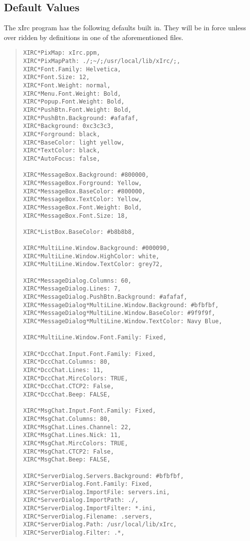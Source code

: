 \documentclass[titlepage]{article}
\begin{document}
\subsection{Default Values}
The xIrc program has the following defaults built in. They will be in
force unless over ridden by definitions in one of the aforementioned
files.
\begin{quote}
\begin{verbatim}
XIRC*PixMap: xIrc.ppm,
XIRC*PixMapPath: ./;~/;/usr/local/lib/xIrc/;,
XIRC*Font.Family: Helvetica,
XIRC*Font.Size: 12,
XIRC*Font.Weight: normal,
XIRC*Menu.Font.Weight: Bold,
XIRC*Popup.Font.Weight: Bold,
XIRC*PushBtn.Font.Weight: Bold,
XIRC*PushBtn.Background: #afafaf,
XIRC*Background: 0xc3c3c3,
XIRC*Forground: black,
XIRC*BaseColor: light yellow,
XIRC*TextColor: black,
XIRC*AutoFocus: false,

XIRC*MessageBox.Background: #800000,
XIRC*MessageBox.Forground: Yellow,
XIRC*MessageBox.BaseColor: #800000,
XIRC*MessageBox.TextColor: Yellow,
XIRC*MessageBox.Font.Weight: Bold,
XIRC*MessageBox.Font.Size: 18,
   
XIRC*ListBox.BaseColor: #b8b8b8,

XIRC*MultiLine.Window.Background: #000090,
XIRC*MultiLine.Window.HighColor: white,
XIRC*MultiLine.Window.TextColor: grey72,

XIRC*MessageDialog.Columns: 60,
XIRC*MessageDialog.Lines: 7,
XIRC*MessageDialog.PushBtn.Background: #afafaf,
XIRC*MessageDialog*MultiLine.Window.Background: #bfbfbf,
XIRC*MessageDialog*MultiLine.Window.BaseColor: #9f9f9f,
XIRC*MessageDialog*MultiLine.Window.TextColor: Navy Blue,

XIRC*MultiLine.Window.Font.Family: Fixed,

XIRC*DccChat.Input.Font.Family: Fixed,
XIRC*DccChat.Columns: 80,
XIRC*DccChat.Lines: 11,
XIRC*DccChat.MircColors: TRUE,
XIRC*DccChat.CTCP2: False,
XIRC*DccChat.Beep: FALSE,

XIRC*MsgChat.Input.Font.Family: Fixed,
XIRC*MsgChat.Columns: 80,
XIRC*MsgChat.Lines.Channel: 22,
XIRC*MsgChat.Lines.Nick: 11,
XIRC*MsgChat.MircColors: TRUE,
XIRC*MsgChat.CTCP2: False,
XIRC*MsgChat.Beep: FALSE,

XIRC*ServerDialog.Servers.Background: #bfbfbf,
XIRC*ServerDialog.Font.Family: Fixed,
XIRC*ServerDialog.ImportFile: servers.ini,
XIRC*ServerDialog.ImportPath: ./,
XIRC*ServerDialog.ImportFilter: *.ini,
XIRC*ServerDialog.Filename: .servers,
XIRC*ServerDialog.Path: /usr/local/lib/xIrc,
XIRC*ServerDialog.Filter: .*,
\end{verbatim}
\end{quote}
\end{document}
